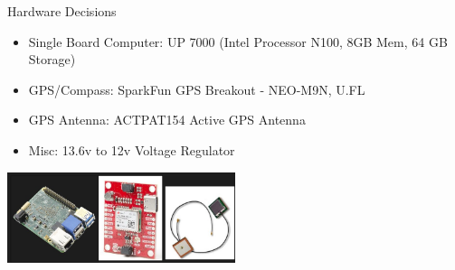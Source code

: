 




\begin{frame}{Hardware Decisions}
    \begin{itemize}
        \item Single Board Computer: UP 7000 (Intel Processor N100, 8GB Mem, 64 GB Storage)
        \item GPS/Compass: SparkFun GPS Breakout - NEO-M9N, U.FL
        \item GPS Antenna: ACTPAT154 Active GPS Antenna
        \item Misc: 13.6v to 12v Voltage Regulator
    \end{itemize}
    \centering
    \includegraphics[height=0.5\textheight,width=0.5\textwidth,keepaspectratio]{images/rtt/Screenshot 2024-04-22 103014.jpg}
\end{frame}

